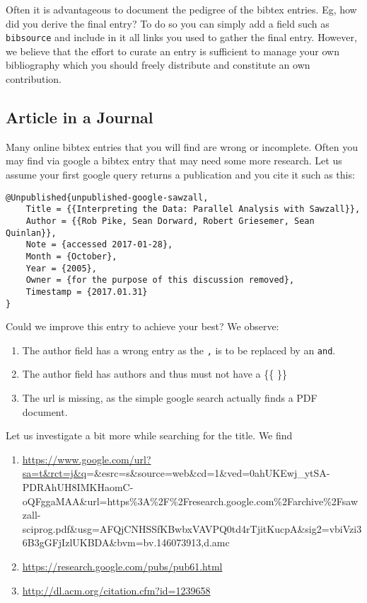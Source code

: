 Often it is advantageous to document the pedigree of the bibtex
entries. Eg, how did you derive the final entry? To do so you can
simply add a field such as \verb|bibsource| and include in it all
links you used to gather the final entry. However, we believe that the
effort to curate an entry is sufficient to manage your own
bibliography which you should freely distribute and constitute an own
contribution. 

\subsection{Article in a Journal}
\label{s:e:article-in-a-journal}

Many online bibtex entries that you will find are wrong or
incomplete. Often you may find via google a bibtex entry that may need
some more research. Let us assume your first google query returns a
publication and you cite it such as this:

\begin{verbatim}
@Unpublished{unpublished-google-sawzall,
    Title = {{Interpreting the Data: Parallel Analysis with Sawzall}},
    Author = {{Rob Pike, Sean Dorward, Robert Griesemer, Sean Quinlan}},
    Note = {accessed 2017-01-28},
    Month = {October},
    Year = {2005},
    Owner = {for the purpose of this discussion removed},
    Timestamp = {2017.01.31}
}
\end{verbatim}

Could we improve this entry to achieve your best? We observe:

\begin{enumerate}
\item
  The author field has a wrong entry as the \verb|,| is to be replaced by an
  \verb|and|.
\item
  The author field has authors and thus must not have a \{\{ \}\}
\item
  The url is missing, as the simple google search actually finds a PDF
  document.
\end{enumerate}

Let us investigate a bit more while searching for the title. We find

\begin{enumerate}
\def\labelenumi{\Alph{enumi}}
\item
  \url{https://www.google.com/url?sa=t\&rct=j\&q}=\&esrc=s\&source=web\&cd=1\&ved=0ahUKEwj\_ytSA-PDRAhUH8IMKHaomC-oQFggaMAA\&url=https\%3A\%2F\%2Fresearch.google.com\%2Farchive\%2Fsawzall-sciprog.pdf\&usg=AFQjCNHSSfKBwbxVAVPQ0td4rTjitKucpA\&sig2=vbiVzi36B3gGFjIzlUKBDA\&bvm=bv.146073913,d.amc
\item
  \url{https://research.google.com/pubs/pub61.html}
\item
  \url{http://dl.acm.org/citation.cfm?id=1239658}
\end{enumerate}

